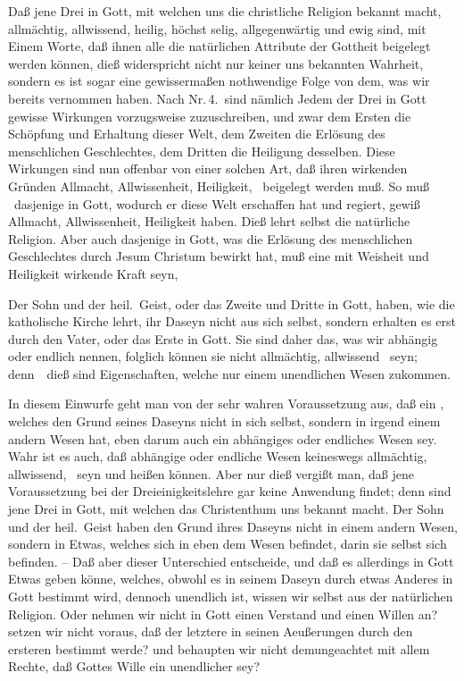 Daß jene Drei in Gott, mit welchen uns die christliche Religion bekannt macht, allmächtig, allwissend, heilig, höchst selig, allgegenwärtig und ewig sind, mit Einem Worte, daß ihnen alle die natürlichen Attribute der Gottheit beigelegt werden können, dieß widerspricht nicht nur keiner uns bekannten Wahrheit, sondern es ist sogar eine gewissermaßen nothwendige Folge von dem, was wir bereits vernommen haben. Nach Nr.\,4.\ sind nämlich Jedem der Drei in Gott gewisse Wirkungen vorzugsweise zuzuschreiben, und zwar dem Ersten die Schöpfung und Erhaltung dieser Welt, dem Zweiten die Erlösung des menschlichen Geschlechtes, dem Dritten die Heiligung desselben. Diese Wirkungen sind nun offenbar von einer solchen Art, daß ihren wirkenden Gründen Allmacht, Allwissenheit, Heiligkeit, \usw\ beigelegt werden muß. So muß \zB\ dasjenige in Gott, wodurch er diese Welt erschaffen hat und regiert, gewiß Allmacht, Allwissenheit, Heiligkeit haben. Dieß lehrt selbst die natürliche Religion. Aber auch dasjenige in Gott, was die Erlösung des menschlichen Geschlechtes durch Jesum Christum bewirkt hat, muß eine mit Weisheit und Heiligkeit wirkende Kraft seyn, \usw\par
{} Der Sohn und der heil.\ Geist, oder das Zweite und Dritte in Gott, haben, wie die katholische Kirche lehrt, ihr Daseyn nicht aus sich selbst, sondern erhalten es erst durch den Vater, oder das Erste in Gott. Sie sind daher das, was wir abhängig oder endlich nennen, folglich können sie nicht allmächtig, allwissend \udgl\  seyn; denn~\ dieß sind Eigenschaften, welche nur einem unendlichen Wesen zukommen.\par
{} In diesem Einwurfe geht man von der sehr wahren Voraussetzung aus, daß ein , welches den Grund seines Daseyns nicht in sich selbst, sondern in irgend einem andern Wesen hat, eben darum auch ein abhängiges oder endliches Wesen sey. Wahr ist es auch, daß abhängige oder endliche Wesen keineswegs allmächtig, allwissend, \usw\ seyn und heißen können. Aber nur dieß vergißt man, daß jene Voraussetzung bei der Dreieinigkeitslehre gar keine Anwendung findet; denn  sind jene Drei in Gott, mit welchen das Christenthum uns bekannt macht. Der Sohn und der heil.\ Geist haben den Grund ihres Daseyns nicht in einem andern Wesen, sondern in Etwas, welches sich in eben dem Wesen befindet, darin sie selbst sich befinden. -- Daß aber dieser Unterschied entscheide, und daß es allerdings in Gott Etwas geben könne, welches, obwohl es in seinem Daseyn durch etwas Anderes in Gott bestimmt wird, dennoch unendlich ist, wissen wir selbst aus der natürlichen Religion. Oder nehmen wir nicht in Gott einen Verstand und einen Willen an? setzen wir nicht voraus, daß der letztere in seinen Aeußerungen durch den ersteren bestimmt werde? und behaupten wir nicht demungeachtet mit allem Rechte, daß Gottes Wille ein unendlicher sey?\par
